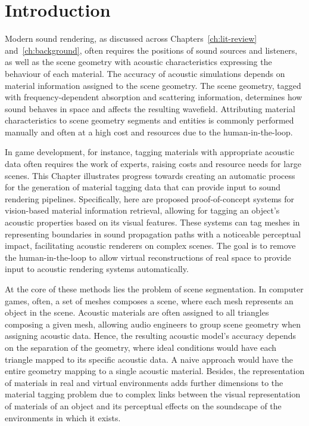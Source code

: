\section{Introduction}
Modern sound rendering, as discussed across Chapters~\ref{ch:lit-review} and~\ref{ch:background}, often requires the positions of sound sources and listeners, as well as the scene geometry with acoustic characteristics expressing the behaviour of each material. The accuracy of acoustic simulations depends on material information assigned to the scene geometry. The scene geometry, tagged with frequency-dependent absorption and scattering information, determines how sound behaves in space and affects the resulting wavefield. Attributing material characteristics to scene geometry segments and entities is commonly performed manually and often at a high cost and resources due to the human-in-the-loop.\par
In game development, for instance, tagging materials with appropriate acoustic data often requires the work of experts, raising costs and resource needs for large scenes. This Chapter illustrates progress towards creating an automatic process for the generation of material tagging data that can provide input to sound rendering pipelines. Specifically, here are proposed proof-of-concept systems for vision-based material information retrieval, allowing for tagging an object's acoustic properties based on its visual features. These systems can tag meshes in  representing boundaries in sound propagation paths with a noticeable perceptual impact, facilitating acoustic renderers on complex scenes. The goal is to remove the human-in-the-loop to allow virtual reconstructions of real space to provide input to acoustic rendering systems automatically.\par
At the core of these methods lies the problem of scene segmentation. In computer games, often, a set of meshes composes a scene, where each mesh represents an object in the scene. Acoustic materials are often assigned to all triangles composing a given mesh, allowing audio engineers to group scene geometry when assigning acoustic data. Hence, the resulting acoustic model's accuracy depends on the separation of the geometry, where ideal conditions would have each triangle mapped to its specific acoustic data. A naive approach would have the entire geometry mapping to a single acoustic material. Besides, the representation of materials in real and virtual environments adds further dimensions to the material tagging problem due to complex links between the visual representation of materials of an object and its perceptual effects on the soundscape of the environments in which it exists.\par
